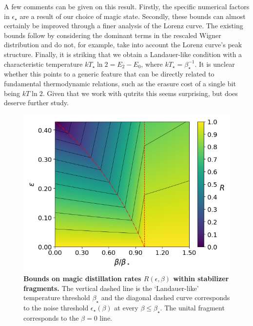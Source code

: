 \documentclass[pra,
aps,
twocolumn,
superscriptaddress,
groupedaddress,
nofootinbib,
reprint
]{revtex4-1}
\begin{document}
A few comments can be given on this result. Firstly, the specific numerical factors in $\epsilon_\star$ are a result of our choice of magic state. Secondly, these bounds can almost certainly be improved through a finer analysis of the Lorenz curve. The existing bounds follow by considering the dominant terms in the rescaled Wigner distribution and do not, for example, take into account the Lorenz curve's peak structure.  Finally, it is striking that we obtain a Landauer-like condition with a characteristic temperature $kT_\star \ln 2 = E_2 - E_0$, where $kT_\star = \beta_\star^{-1}$. It is unclear whether this points to a generic feature that can be directly related to fundamental thermodynamic relations, such as the erasure cost of a single bit being $kT \ln 2$. Given that we work with qutrits this seems surprising, but does deserve further study.


\begin{figure}[t!]
    \centering
    \includegraphics[scale=0.5]{figs/rate_contour.png}
    \caption{\textbf{Bounds on magic distillation rates $R(\epsilon, \beta)$ within stabilizer fragments.}
    The vertical dashed line is the `Landauer-like' temperature threshold $\beta_\star$ and the diagonal dashed curve corresponds to the noise threshold $\epsilon_\star (\beta)$ at every $\beta \leq \beta_\star$. The unital fragment corresponds to the $\beta =0 $ line.
    }
    \label{fig:rate_contour}
\end{figure}
\end{document}
